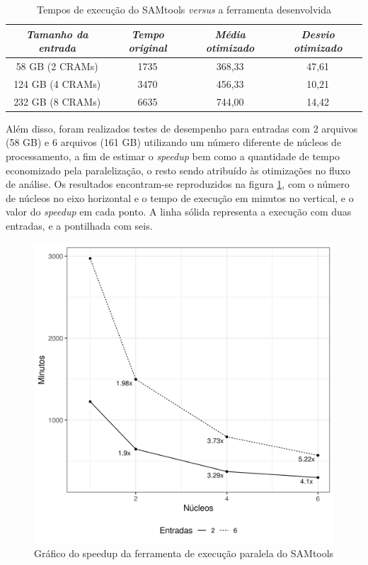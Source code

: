 \documentclass[cic,tc]{iiufrgs}
\begin{document}
\begin{table}[h]
    \caption{Tempos de execução do SAMtools \textit{versus} a ferramenta desenvolvida}
    \centering
        \begin{tabular}{c|c|c|c}
          \hline
          \textit{Tamanho da entrada}  &   \textit{Tempo original}  & \textit{Média otimizado} & \textit{Desvio otimizado} \\
          \hline
          \hline
          58 GB (2 CRAMs)  & 1735 & 368,33 & 47,61 \\
          124 GB (4 CRAMs) & 3470 & 456,33 & 10,21 \\
          232 GB (8 CRAMs) & 6635 & 744,00 & 14,42 \\
          \hline
        \end{tabular}
    \label{tbl:SAMtools}
\end{table}

Além disso, foram realizados testes de desempenho para entradas com 2 arquivos
(58 GB) e 6 arquivos (161 GB) utilizando um número diferente de núcleos de
processamento, a fim de estimar o \textit{speedup} bem como a quantidade de
tempo economizado pela paralelização, o resto sendo atribuído às otimizações no
fluxo de análise. Os resultados encontram-se reproduzidos na figura
\ref{fig:speedup}, com o número de núcleos no eixo horizontal e o tempo de
execução em minutos no vertical, e o valor do \textit{speedup} em cada ponto. A
linha sólida representa a execução com duas entradas, e a pontilhada com seis.

\begin{figure}
  \caption{Gráfico do speedup da ferramenta de execução paralela do SAMtools}
    \begin{center}
      \includegraphics[width=0.55\linewidth]{img/speedup.png}
    \end{center}
    \label{fig:speedup}
\end{figure}
\end{document}
